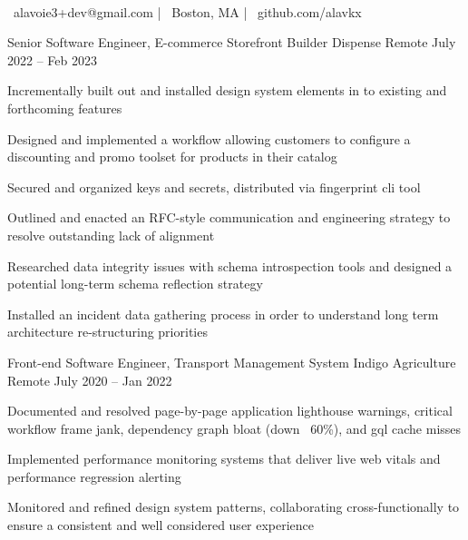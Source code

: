 \documentclass[]{awesome-cv}
\begin{document}
    
\begin{center}
	  \\
	\vspace{2mm}
	{\faEnvelope\ alavoie3+dev@gmail.com} | {\faMapMarker\ Boston, MA} | {\faLink\ github.com/alavkx}
\end{center}

\begin{cventries}
	\cventry
	{Senior Software Engineer, E-commerce Storefront Builder}
	{Dispense}
	{Remote}
	{July 2022 – Feb 2023}
	{\begin{cvitems}
		\item {Incrementally built out and installed design system elements in to existing and forthcoming features}
		\item {Designed and implemented a workflow allowing customers to configure a discounting and promo toolset for products in their catalog}
		\item {Secured and organized keys and secrets, distributed via fingerprint cli tool}
		\item {Outlined and enacted an RFC-style communication and engineering strategy to resolve outstanding lack of alignment}
		\item {Researched data integrity issues with schema introspection tools and designed a potential long-term schema reflection strategy}
		\item {Installed an incident data gathering process in order to understand long term architecture re-structuring priorities}
		\end{cvitems}}
	\cventry
	{Front-end Software Engineer, Transport Management System}
	{Indigo Agriculture}
	{Remote}
	{July 2020 – Jan 2022}
	{\begin{cvitems}
		\item {Documented and resolved page-by-page application lighthouse warnings, critical workflow frame jank, dependency graph bloat (down ~60\%), and gql cache misses}
		\item {Implemented performance monitoring systems that deliver live web vitals and performance regression alerting}
		\item {Monitored and refined design system patterns, collaborating cross-functionally to ensure a consistent and well considered user experience}

\end{cvitems}}
\end{cventries}
\end{document}
